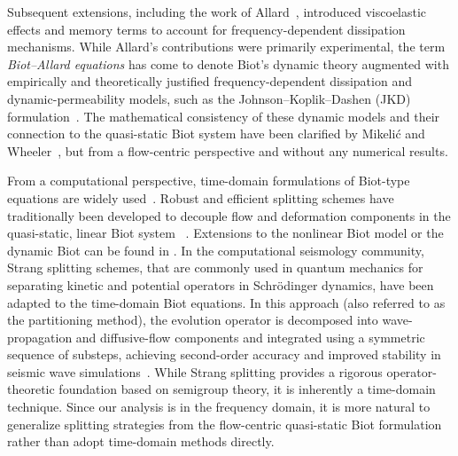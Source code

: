 \documentclass[pdflatex,sn-mathphys-num]{sn-jnl}
\theoremstyle{thmstyleone}%
\theoremstyle{thmstyletwo}%
\theoremstyle{thmstylethree}%
\theoremstyle{definition}
\begin{document}
	Subsequent extensions, including the work of Allard~\cite{Allard1993}, introduced viscoelastic effects and memory terms to account for frequency-dependent dissipation mechanisms. While Allard's contributions were primarily experimental, the term \emph{Biot--Allard equations} has come to denote Biot's dynamic theory augmented with empirically and theoretically justified frequency-dependent dissipation and dynamic-permeability models, such as the Johnson--Koplik--Dashen (JKD) formulation~\cite{Johnson1987}. The mathematical consistency of these dynamic models and their connection to the quasi-static Biot system have been clarified by Mikeli\'c and Wheeler~\cite{Mikelic2012}, but from a flow-centric perspective and without any numerical results. 
	
	From a computational perspective, time-domain formulations of Biot-type equations are widely used~\cite{carcione2010, Masson2010,Huang2022b, santos1988a}.  Robust and efficient splitting schemes have traditionally been developed to decouple flow and deformation components in the quasi-static, linear Biot system ~\cite{Both2017, Kim2009, kim_undrained2011, mikelic2013, storvik2019}. Extensions to the nonlinear Biot model or the dynamic Biot can be found in \cite{borregales2018, borregales2021, bause2020, kimPHD, kim_2025}. In the computational seismology community, Strang splitting schemes, that are commonly used in quantum mechanics for separating kinetic and potential operators in Schrödinger dynamics, have been adapted to the time-domain Biot equations. In this approach (also referred to as the partitioning method), the evolution operator is decomposed into wave-propagation and diffusive-flow components and integrated using a symmetric sequence of substeps, achieving second-order accuracy and improved stability in seismic wave simulations~\cite{Carcione2022,carcione1995}. While Strang splitting provides a rigorous operator-theoretic foundation based on semigroup theory, it is inherently a time-domain technique. Since our analysis is in the frequency domain, it is more natural to generalize splitting strategies from the flow-centric quasi-static Biot formulation rather than adopt time-domain methods directly. 
	
\end{document}
